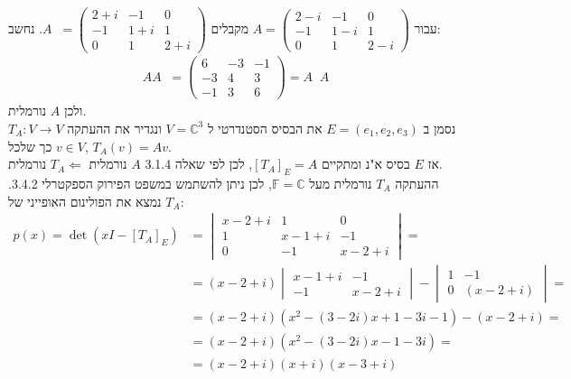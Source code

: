 \documentclass{article}
\def\complex{\mathbb{C}}
\def\field{\mathbb{F}}
\DeclareMathOperator{\adj}{^\ast}
\begin{document}
עבור $A=\begin{pmatrix}
        2-i & -1  & 0   \\
        -1  & 1-i & 1   \\
        0   & 1   & 2-i
    \end{pmatrix}$ מקבלים $A\adj = \begin{pmatrix}
        2+i & -1  & 0   \\
        -1  & 1+i & 1   \\
        0   & 1   & 2+i
    \end{pmatrix}$. נחשב:
\begin{align*}
    AA \adj = \begin{pmatrix}
                  6  & -3 & -1 \\
                  -3 & 4  & 3  \\
                  -1 & 3  & 6
              \end{pmatrix} = A \adj A
\end{align*}
ולכן $A$ נורמלית. \\
נסמן ב $E=(e_1, e_2, e_3)$ את הבסיס הסטנדרטי ל $V=\complex^3$ ונגדיר את ההעתקה $T_A: V \rightarrow V$ כך שלכל $v\in V$, $T_A(v)=Av$. \\
אז $E$ בסיס א"נ ומתקיים $[T_A]_E=A$, לכן לפי שאלה 3.1.4 $A$ נורמלית $T_A\Leftarrow$ נורמלית.\\
ההעתקה $T_A$ נורמלית מעל $\field=\complex$, לכן ניתן להשתמש במשפט הפירוק הספקטרלי 3.4.2. נמצא את הפולינום האופייני של $T_A$:
\begin{align*}
    p(x)=\det(xI-[T_A]_E) & =\begin{vmatrix}
                                 x-2+i & 1     & 0     \\
                                 1     & x-1+i & -1    \\
                                 0     & -1    & x-2+i
                             \end{vmatrix}=                 \\
                          & = (x-2+i)\begin{vmatrix}
                                         x-1+i & -1    \\
                                         -1    & x-2+i
                                     \end{vmatrix}-\begin{vmatrix}
                                                       1 & -1      \\
                                                       0 & (x-2+i)
                                                   \end{vmatrix} = \\
                          & = (x-2+i)(x^2-(3-2i)x+1-3i-1)-(x-2+i)= \\
                          & = (x-2+i)(x^2-(3-2i)x-1-3i)=           \\
                          & = (x-2+i)(x+i)(x-3+i)
\end{align*}
\end{document}
